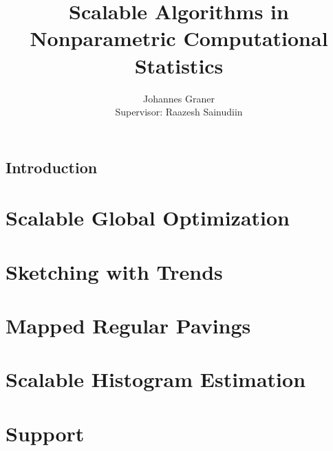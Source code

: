 \documentclass{report}
\author{Johannes Graner\\{\small Supervisor: Raazesh Sainudiin}}
\title{Scalable Algorithms in Nonparametric Computational Statistics}
\begin{document}
  \maketitle

  \begin{abstract}
    
  \end{abstract}

  \tableofcontents

  \newpage

  \section{Introduction}
    

  \chapter{Scalable Global Optimization}
    

  \chapter{Sketching with Trends}
    

  \chapter{Mapped Regular Pavings}
    

  \chapter{Scalable Histogram Estimation}
    

  \chapter*{Support}
    

  
  
\end{document}
